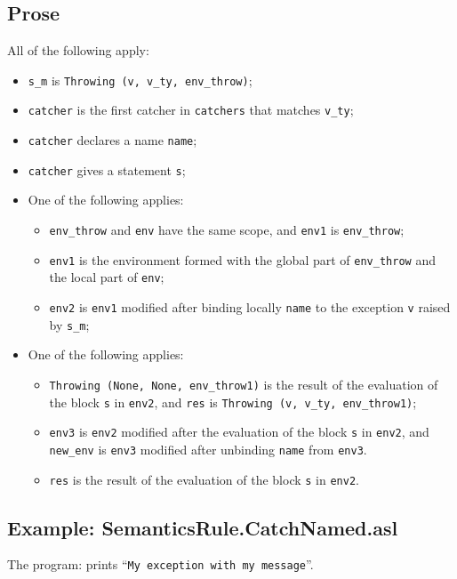 \documentclass{book}
\begin{document}
    \subsection{Prose}
    All of the following apply:
    \begin{itemize}
    \item \texttt{s\_m} is \texttt{Throwing (v, v\_ty, env\_throw)};
    \item \texttt{catcher} is the first catcher in \texttt{catchers} that matches \texttt{v\_ty};
    \item \texttt{catcher} declares a name \texttt{name};
    \item \texttt{catcher} gives a statement \texttt{s};
    \item One of the following applies:
      \begin{itemize}
      \item \texttt{env\_throw} and \texttt{env} have the same scope, and \texttt{env1} is \texttt{env\_throw};
      \item \texttt{env1} is the environment formed with the global part of \texttt{env\_throw}
        and the local part of \texttt{env};
      \item \texttt{env2} is \texttt{env1} modified after binding locally \texttt{name} to the exception
        \texttt{v} raised by \texttt{s\_m};
      \end{itemize}
    \item One of the following applies:
      \begin{itemize}
      \item \texttt{Throwing (None, None, env\_throw1)} is the result of the evaluation of
        the block \texttt{s} in \texttt{env2}, and \texttt{res} is \texttt{Throwing (v, v\_ty, env\_throw1)};
      \item \texttt{env3} is \texttt{env2} modified after the evaluation of the block \texttt{s} in
        \texttt{env2}, and \texttt{new\_env} is \texttt{env3} modified after unbinding \texttt{name} from
        \texttt{env3}.
      \item \texttt{res} is the result of the evaluation of the block \texttt{s} in \texttt{env2}.
      \end{itemize}
    \end{itemize}

    \subsection{Example: SemanticsRule.CatchNamed.asl}
    The program:
    prints ``\texttt{My exception with my message}''.
\end{document}
